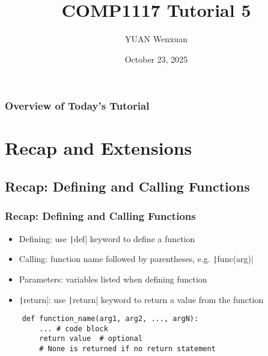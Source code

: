 \documentclass{beamer}
\title{COMP1117 Tutorial 5}
\author{YUAN Wenxuan}
\date{October 23, 2025}
\newcommand{\python}[1]{\texttt|#1|}
\begin{document}
\frame{\titlepage}

\begin{frame}
    \frametitle{Overview of Today's Tutorial}
    \tableofcontents
\end{frame}

\section{Recap and Extensions}
\subsection{Recap: Defining and Calling Functions}
\begin{frame}[fragile]
    \frametitle{Recap: Defining and Calling Functions}
    \begin{itemize}
        \item Defining: use \python{def} keyword to define a function
        \item Calling: function name followed by parentheses, e.g. \python{func(arg)}
        \item Parameters: variables listed when defining function
        \item \python{return}: use \python{return} keyword to return a value from the function
    \end{itemize}
    \begin{verbatim}
    def function_name(arg1, arg2, ..., argN):
        ... # code block
        return value  # optional
        # None is returned if no return statement
    \end{verbatim}
\end{frame}
\end{document}
